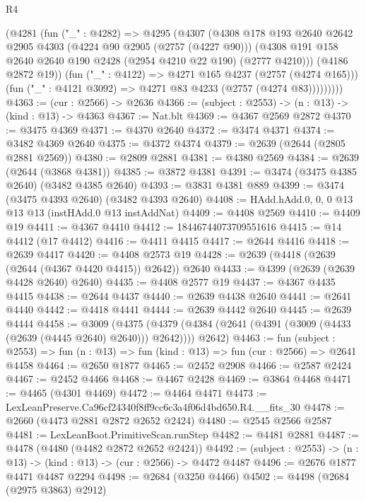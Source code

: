 \begin{lexlean}{R4}
\begin{coremodule}
            (@4281
              (fun ("_" : @4282) =>
              @4295
                (@4307
                  (@4308
                    @178
                    @193
                    @2640
                    @2642
                    @2905
                    @4303
                    (@4224 @90 @2905 (@2757 (@4227 @90)))
                    (@4308 @191 @158 @2640 @2640 @190 @2428 (@2954 @4210 @22 @190) (@2777 @4210)))
                  (@4186 @2872 @19))
                (fun ("_" : @4122) => @4271 @165 @4237 (@2757 (@4274 @165)))
                (fun ("_" : @4121 @3092) => @4271 @83 @4233 (@2757 (@4274 @83)))))))))
@4363 := (cur : @2566) -> @2636
@4366 := (subject : @2553) -> (n : @13) -> (kind : @13) -> @4363
@4367 := Nat.blt
@4369 := @4367 @2569 @2872
@4370 := @3475 @4369
@4371 := @4370 @2640
@4372 := @3474 @4371
@4374 := @3482 @4369 @2640
@4375 := @4372 @4374
@4379 := @2639 (@2644 (@2805 @2881 @2569))
@4380 := @2809 @2881
@4381 := @4380 @2569
@4384 := @2639 (@2644 (@3868 @4381))
@4385 := @3872 @4381
@4391 := @3474 (@3475 @4385 @2640) (@3482 @4385 @2640)
@4393 := @3831 @4381 @889
@4399 := @3474 (@3475 @4393 @2640) (@3482 @4393 @2640)
@4408 := HAdd.hAdd.{0, 0, 0} @13 @13 @13 (instHAdd.{0} @13 instAddNat)
@4409 := @4408 @2569
@4410 := @4409 @19
@4411 := @4367 @4410
@4412 := 18446744073709551616
@4415 := @14 @4412 (@17 @4412)
@4416 := @4411 @4415
@4417 := @2644 @4416
@4418 := @2639 @4417
@4420 := @4408 @2573 @19
@4428 := @2639 (@4418 (@2639 (@2644 (@4367 @4420 @4415)) @2642)) @2640
@4433 := @4399 (@2639 (@2639 @4428 @2640) @2640)
@4435 := @4408 @2577 @19
@4437 := @4367 @4435 @4415
@4438 := @2644 @4437
@4440 := @2639 @4438 @2640
@4441 := @2641 @4440
@4442 := @4418 @4441
@4444 := @2639 @4442 @2640
@4445 := @2639 @4444
@4458 := @3009
    (@4375 (@4379 (@4384 (@2641 (@4391 (@3009 (@4433 (@2639 (@4445 @2640) @2640))) @2642)))) @2642)
@4463 := fun (subject : @2553) =>
  fun (n : @13) => fun (kind : @13) => fun (cur : @2566) => @2641 @4458
@4464 := @2650 @1877
@4465 := @2452 @2908
@4466 := @2587 @2424
@4467 := @2452 @4466
@4468 := @4467 @2428
@4469 := @3864 @4468
@4471 := @4465 (@4301 @4469)
@4472 := @4464 @4471
@4473 := LexLeanPreserve.Ca96cf24340f8ff9cc6c3a4f06d4bd650.R4.__fits_30
@4478 := @2660 (@4473 @2881 @2872 @2652 @2424)
@4480 := @2545 @2566 @2587
@4481 := LexLeanBoot.PrimitiveScan.runStep
@4482 := @4481 @2881
@4487 := @4478 (@4480 (@4482 @2872 @2652 @2424))
@4492 := (subject : @2553) -> (n : @13) -> (kind : @13) -> (cur : @2566) -> @4472 @4487
@4496 := @2676 @1877 @4471 @4487 @2294
@4498 := @2684 (@3250 @4466)
@4502 := @4498 (@2684 (@2975 @3863) @2912)

\end{coremodule}
\end{lexlean}
